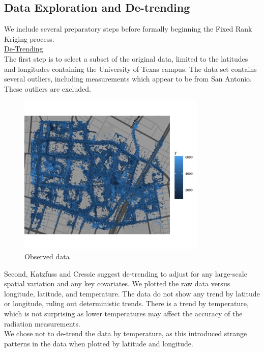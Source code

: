 \documentclass[11pt]{article}
\begin{document}
\subsection{Data Exploration and De-trending}
We include several preparatory steps before formally beginning the Fixed Rank Kriging process.\\

\underline{De-Trending}\\

The first step is to select a subset of the original data, limited to the latitudes and longitudes containing the University of Texas campus.  The data set contains several outliers, including measurements which appear to be from San Antonio.  These outliers are excluded. \\

\begin{figure}[H]
\centering
\includegraphics[width=90mm,keepaspectratio]{Images/original_data_plot.jpg}
\caption{Observed data \label{fig:1}}
\end{figure}

Second, Katzfuss and Cressie suggest de-trending to adjust for any large-scale spatial variation and any key covariates.  We plotted the raw data versus longitude, latitude, and temperature.  The data do not show any trend by latitude or longitude, ruling out deterministic trends.  There is a trend by temperature, which is not surprising as lower temperatures may affect the accuracy of the radiation measurements. \\

We chose not to de-trend the data by temperature, as this introduced strange patterns in the data when plotted by latitude and longitude. \\
\end{document}
